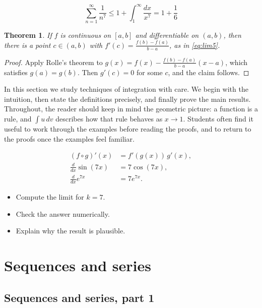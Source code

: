 \documentclass[11pt]{article}
\newtheorem{theorem}{Theorem}[section]
\begin{document}
\[
  \sum_{n=1}^{\infty} \frac{1}{n^{7}} \le 1 + \int_1^{\infty} \frac{dx}{x^{7}} = 1 + \frac{1}{6}
\]

\begin{theorem}
If $f$ is continuous on $[a,b]$ and differentiable on $(a,b)$, then there is a point $c \in (a,b)$ with $f'(c) = \frac{f(b)-f(a)}{b-a}$, as in \eqref{eq:lim5}.
\end{theorem}

\begin{proof}
Apply Rolle's theorem to $g(x) = f(x) - \frac{f(b)-f(a)}{b-a}(x-a)$, which satisfies $g(a) = g(b)$. Then $g'(c) = 0$ for some $c$, and the claim follows.
\end{proof}

In this section we study techniques of integration with care. We begin with the intuition, then state the definitions precisely, and finally prove the main results. Throughout, the reader should keep in mind the geometric picture: a function is a rule, and $\int u\,dv$ describes how that rule behaves as $x \to 1$. Students often find it useful to work through the examples before reading the proofs, and to return to the proofs once the examples feel familiar. 

\begin{align*}
  (f \circ g)'(x) &= f'(g(x))\, g'(x), \\
  \frac{d}{dx} \sin(7 x) &= 7 \cos(7 x), \\
  \frac{d}{dx} e^{7 x} &= 7 e^{7 x}.
\end{align*}

\begin{itemize}
  \item Compute the limit for $k = 7$.
  \item Check the answer numerically.
  \item Explain why the result is plausible.
\end{itemize}

\section{Sequences and series}

\subsection{Sequences and series, part 1}
\end{document}
